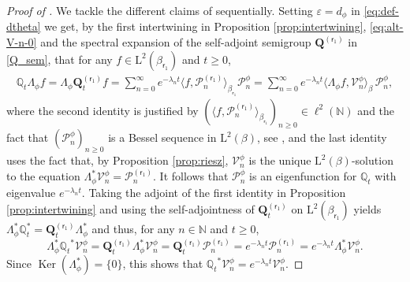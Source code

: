 \documentclass[10pt]{amsart}
\let\epsilon\varepsilon
\theoremstyle{plain}
\theoremstyle{definition}
\DeclareMathOperator{\Ker}{Ker}
\newcommand{\N}{\mathbb{N}}
\renewcommand{\P}{\mathcal{P}}
\newcommand{\V}{\mathcal{V}}
\newcommand{\J}{\mathds{Q}}
\newcommand{\Leb}{\mathrm{L}}
\newcommand{\lam}{{\bm{\lambda}_1}}
\newcommand{\vat}{{\mathsf{r}_1}}
\newcommand{\Q}[1][\mo]{\mathbf{Q}^{({#1})}}
\newcommand{\gab}[1][\lam,\mo]{{\beta_{#1}}}
\let\mo\mu
\let\bpsi\beta
\begin{document}
\begin{proof}[Proof of ]
We tackle the different claims of  sequentially. Setting $\epsilon = d_\phi$ in \eqref{eq:def-dtheta} we get, by the first intertwining in Proposition \ref{prop:intertwining}, \eqref{eq:alt-V-n-0}
and the spectral expansion of the self-adjoint semigroup $\Q[\vat]$ in \eqref{Q_sem}, that for any $f \in \Leb^2(\gab[\vat])$ and $t \geq 0$,
\begin{align*}
\J_t \Lambda_\phi f = \Lambda_\phi \Q[\vat]_t f = \sum_{n=0}^\infty e^{-\lambda_n t} \langle f, \P_n^{(\vat)} \rangle_{\gab[\vat]} \P_n^\phi = \sum_{n=0}^\infty e^{-\lambda_n t} \langle \Lambda_\phi f, \V_n^\phi \rangle_{\bpsi}\, \P_n^\phi,
\end{align*}
where the second identity is justified by $(\langle f, \P_n^{(\vat)}\rangle_{\gab[\vat]})_{n \geq 0} \in \ell^2(\N)$ and the fact that $(\P_n^\phi)_{n \geq 0}$ is a Bessel sequence in $\Leb^2(\bpsi)$, see \cite[Th.\,3.1.3]{Christensen2003a}, and the last identity uses the fact that, by Proposition \ref{prop:riesz}, $\V_n^\phi$ is the unique $\Leb^2(\bpsi)$-solution to the equation $\Lambda_\phi^* \V_n^\phi = \P_n^{(\vat)}$. It follows that $\P_n^\phi$ is an eigenfunction for $\J_t$ with eigenvalue $e^{-\lambda_n t}$. Taking the adjoint of the first identity in Proposition \ref{prop:intertwining}
and using the self-adjointness of $\Q[\vat]_t$ on $\Leb^2(\gab[\vat])$ yields $\Lambda_\phi^* \J_t^* = \Q[\vat]_t \Lambda_\phi^*$ and thus, for any $n \in \N$ and $t \geq 0$,
\begin{equation*}
\Lambda_\phi^* {\J_t}^* \V_n^\phi = \Q[\vat]_t \Lambda_\phi^* \V_n^\phi = \Q[\vat]_t \P_n^{(\vat)} = e^{-\lambda_n t} \P_n^{(\vat)} = e^{-\lambda_n t}\Lambda_\phi^* \V_n^\phi.
\end{equation*}
Since $\Ker(\Lambda_\phi^*) = \{0\}$, this shows that ${\J_t}^* \V_n^\phi = e^{-\lambda_n t} \V_n^\phi$.


\end{proof}
\end{document}
